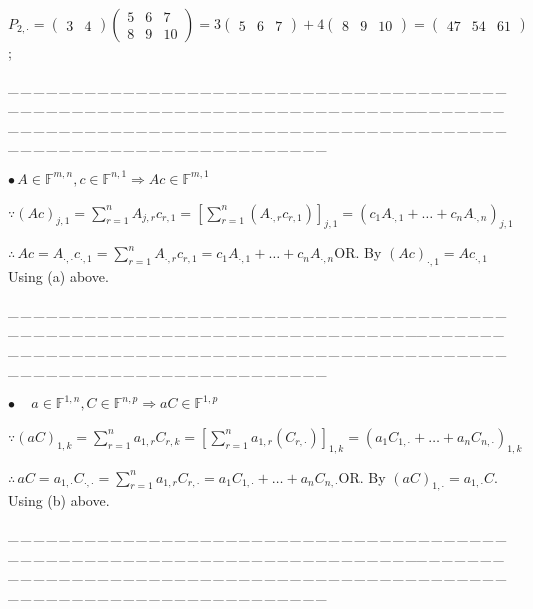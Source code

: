 \documentclass[a4paper, 11pt, UTF8]{article}
\def\Fbb{{\mathbb{F}}}
\def\BulletPoint{{\small$\bullet$}}
\def\Or{\large O{\footnotesize R.} }
\def\ProblemEnding{{\tiny \_\,\_\,\_\,\_\,\_\,\_\,\_\,\_\,\_\,\_\,\_\,\_\,\_\,\_\,\_\,\_\,\_\,\_\,\_\,\_\,\_\,\_\,\_\,\_\,\_\,\_\,\_\,\_\,\_\,\_\,\_\,\_\,\_\,\_\,\_\,\_\,\_\,\_\,\_\,\_\,\_\,\_\,\_\,\_\,\_\,\_\,\_\,\_\,\_\,\_\,\_\,\_\,\_\,\_\,\_\,\_\,\_\,\_\,\_\,\_\,\_\,\_\,\_\,\_\,\_\,\_\,\_\,\_\,\_\,\_\,\_\_\,\_\,\_\,\_\,\_\,\_\,\_\,\_\,\_\,\_\,\_\,\_\,\_\,\_\,\_\,\_\,\_\,\_\,\_\,\_\,\_\,\_\,\_\,\_\,\_\,\_\,\_\,\_\,\_\,\_\,\_\,\_\,\_\,\_\,\_\,\_\,\_\,\_\,\_\,\_\,\_\,\_\,\_\,\_\,\_\,\_\,\_\,\_\,\_\,\_\,\_\,\_\,\_\,\_\,\_\,\_\,\_\,\_\,\_\,\_\,\_\,\_\,\_\,\_\,\_\,\_\,\_\,\_\,\_\,\_\,\_}}
\begin{document}
\begin{large}
	{$P_{2,\cdot}=\begin{pmatrix} 3 & 4\end{pmatrix}\begin{pmatrix} 5 & 6 & 7 \\ 8 & 9 & 10\end{pmatrix}=3\begin{pmatrix} 5 & 6 & 7\end{pmatrix}+4\begin{pmatrix}8 & 9 & 10\end{pmatrix}=\begin{pmatrix} 47 & 54 & 61\end{pmatrix}$;}\par
\ProblemEnding\par

\BulletPoint \,\NoteForSmall{[3.52]}\quad $A\in\Fbb^{m,n},c\in\Fbb^{n,1}\Rightarrow Ac\in\Fbb^{m,1}$\par\quad
$\because(Ac)_{j,1}=\sum\limits_{r=1}^n A_{j,r}c_{r,1}=[\sum\limits_{r=1}^n(A_{\cdot,r}c_{r,1})]_{j,1}=(c_1 A_{\cdot,1}+\dots+c_n A_{\cdot,n})_{j,1}$\par\quad
$\therefore\,Ac=A_{\cdot,\cdot}c_{\cdot,1}=\sum\limits_{r=1}^n A_{\cdot,r}c_{r,1}=c_1 A_{\cdot,1}+\dots+c_n A_{\cdot,n}$\quad \Or By $(Ac)_{\cdot,1}=Ac_{\cdot,1}$ Using (a) above.\par
\ProblemEnding\par
\BulletPoint \,\qquad\,\,\,\, $a\in\Fbb^{1,n},C\in\Fbb^{n,p}\Rightarrow aC\in\Fbb^{1,p}$\par\quad
$\because(aC)_{1,k}=\sum\limits_{r=1}^n a_{1,r}C_{r,k}=[\sum\limits_{r=1}^n a_{1,r}(C_{r,\cdot})]_{1,k}=(a_1 C_{1,\cdot}+\dots+a_n C_{n,\cdot})_{1,k}$\par\quad
$\therefore\,aC=a_{1,\cdot}C_{\cdot,\cdot}=\sum\limits_{r=1}^n a_{1,r}C_{r,\cdot}=a_1 C_{1,\cdot}+\dots+a_n C_{n,\cdot}$\quad \Or By $(aC)_{1,\cdot}=a_{1,\cdot}C$. Using (b) above.
\par
\ProblemEnding\par


\end{large}
\end{document}
